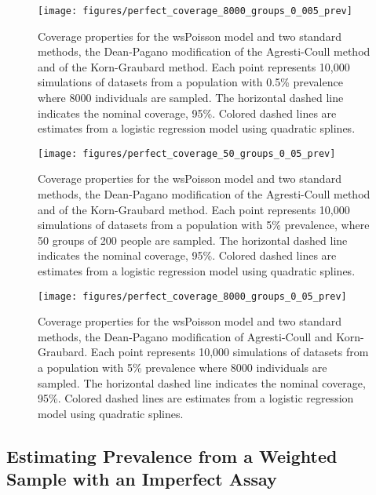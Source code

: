 \begin{figure}
\centering
\texttt{[image: figures/perfect\_coverage\_8000\_groups\_0\_005\_prev]}
\caption{Coverage properties for the wsPoisson model and two standard methods, the Dean-Pagano modification of the Agresti-Coull method and of the Korn-Graubard method.
Each point represents 10,000 simulations of datasets from a population with 0.5\% prevalence where 8000 individuals are sampled.
The horizontal dashed line indicates the nominal coverage, 95\%.
Colored dashed lines are estimates from a logistic regression model using quadratic splines.}
\label{fig:perfect_coverage_8000_groups_0_005_prev}
\end{figure}

\begin{figure}
\centering
\texttt{[image: figures/perfect\_coverage\_50\_groups\_0\_05\_prev]}
\caption{Coverage properties for the wsPoisson model and two standard methods, the Dean-Pagano modification of the Agresti-Coull method and of the Korn-Graubard method.
Each point represents 10,000 simulations of datasets from a population with 5\% prevalence, where 50 groups of 200 people are sampled.
The horizontal dashed line indicates the nominal coverage, 95\%.
Colored dashed lines are estimates from a logistic regression model using quadratic splines.}
\label{fig:perfect_coverage_50_groups_0_05_prev}
\end{figure}

\begin{figure}
\centering
\texttt{[image: figures/perfect\_coverage\_8000\_groups\_0\_05\_prev]}
\caption{Coverage properties for the wsPoisson model and two standard methods, the Dean-Pagano modification of Agresti-Coull and Korn-Graubard.
Each point represents 10,000 simulations of datasets from a population with 5\% prevalence where 8000 individuals are sampled.
The horizontal dashed line indicates the nominal coverage, 95\%.
Colored dashed lines are estimates from a logistic regression model using quadratic splines.}
\label{fig:perfect_coverage_8000_groups_0_05_prev}
\end{figure}


\subsection{Estimating Prevalence from a Weighted Sample with an Imperfect Assay}

